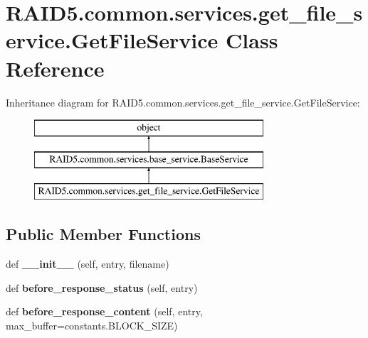 \hypertarget{class_r_a_i_d5_1_1common_1_1services_1_1get__file__service_1_1_get_file_service}{}\section{R\+A\+I\+D5.\+common.\+services.\+get\+\_\+file\+\_\+service.\+Get\+File\+Service Class Reference}
\label{class_r_a_i_d5_1_1common_1_1services_1_1get__file__service_1_1_get_file_service}
Inheritance diagram for R\+A\+I\+D5.\+common.\+services.\+get\+\_\+file\+\_\+service.\+Get\+File\+Service\+:\begin{figure}[H]
\begin{center}
\leavevmode
\includegraphics[height=3.000000cm]{class_r_a_i_d5_1_1common_1_1services_1_1get__file__service_1_1_get_file_service}
\end{center}
\end{figure}
\subsection*{Public Member Functions}
\begin{DoxyCompactItemize}
\item 
\mbox{\label{class_r_a_i_d5_1_1common_1_1services_1_1get__file__service_1_1_get_file_service_a9011d4d97acc336a3fdd7b44c34abaa5}} 
def {\bfseries \+\_\+\+\_\+init\+\_\+\+\_\+} (self, entry, filename)
\item 
\mbox{\label{class_r_a_i_d5_1_1common_1_1services_1_1get__file__service_1_1_get_file_service_af9e40a37b80855d4890068c477b51d24}} 
def {\bfseries before\+\_\+response\+\_\+status} (self, entry)
\item 
\mbox{\label{class_r_a_i_d5_1_1common_1_1services_1_1get__file__service_1_1_get_file_service_a3ef48982c21b7aeb08722458d0708554}} 
def {\bfseries before\+\_\+response\+\_\+content} (self, entry, max\+\_\+buffer=constants.\+B\+L\+O\+C\+K\+\_\+\+S\+I\+ZE)
\end{DoxyCompactItemize}
